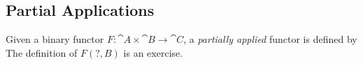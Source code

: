\subsection{Partial Applications}

Given a binary functor $F : \cat{A} \times \cat{B} \to \cat{C}$, a \emph{partially applied} functor
is defined by
The definition of $F(\texttt{?},B)$ is an exercise. 




